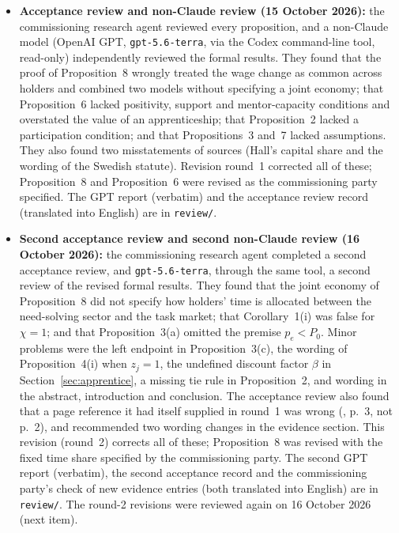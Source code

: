 \documentclass[12pt]{article}
\theoremstyle{remark}
\begin{document}
\begin{itemize}[itemsep=1pt]
\item \textbf{Acceptance review and non-Claude review (15 October 2026):} the commissioning research agent reviewed every proposition, and a non-Claude model (OpenAI GPT, \texttt{gpt-5.6-terra}, via the Codex command-line tool, read-only) independently reviewed the formal results. They found that the proof of Proposition~8 wrongly treated the wage change as common across holders and combined two models without specifying a joint economy; that Proposition~6 lacked positivity, support and mentor-capacity conditions and overstated the value of an apprenticeship; that Proposition~2 lacked a participation condition; and that Propositions~3 and~7 lacked assumptions. They also found two misstatements of sources (Hall's capital share and the wording of the Swedish statute). Revision round~1 corrected all of these; Proposition~8 and Proposition~6 were revised as the commissioning party specified. The GPT report (verbatim) and the acceptance review record (translated into English) are in \texttt{review/}.
\item \textbf{Second acceptance review and second non-Claude review (16 October 2026):} the commissioning research agent completed a second acceptance review, and \texttt{gpt-5.6-terra}, through the same tool, a second review of the revised formal results. They found that the joint economy of Proposition~8 did not specify how holders' time is allocated between the need-solving sector and the task market; that Corollary~1(i) was false for $\chi=1$; and that Proposition~3(a) omitted the premise $p_e<P_0$. Minor problems were the left endpoint in Proposition~3(c), the wording of Proposition~4(i) when $z_j=1$, the undefined discount factor $\beta$ in Section~\ref{sec:apprentice}, a missing tie rule in Proposition~2, and wording in the abstract, introduction and conclusion. The acceptance review also found that a page reference it had itself supplied in round~1 was wrong (\citealp{korom2025penda}, p.~3, not p.~2), and recommended two wording changes in the evidence section. This revision (round~2) corrects all of these; Proposition~8 was revised with the fixed time share specified by the commissioning party. The second GPT report (verbatim), the second acceptance record and the commissioning party's check of new evidence entries (both translated into English) are in \texttt{review/}. The round-2 revisions were reviewed again on 16 October 2026 (next item).

\end{itemize}
\end{document}
